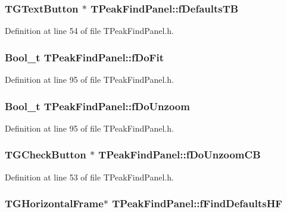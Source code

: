 \subsubsection[{fDefaultsTB}]{\setlength{\rightskip}{0pt plus 5cm}TGTextButton $\ast$ {\bf TPeakFindPanel::fDefaultsTB}\hspace{0.3cm}{\ttfamily  [private]}}\label{classTPeakFindPanel_a9b6f02b821aef2b76c3e3dc5cccca726}


Definition at line 54 of file TPeakFindPanel.h.
\subsubsection[{fDoFit}]{\setlength{\rightskip}{0pt plus 5cm}Bool\_\-t {\bf TPeakFindPanel::fDoFit}\hspace{0.3cm}{\ttfamily  [protected]}}\label{classTPeakFindPanel_a0d1c1e970b53cbae773a3fca98434573}


Definition at line 95 of file TPeakFindPanel.h.
\subsubsection[{fDoUnzoom}]{\setlength{\rightskip}{0pt plus 5cm}Bool\_\-t {\bf TPeakFindPanel::fDoUnzoom}\hspace{0.3cm}{\ttfamily  [protected]}}\label{classTPeakFindPanel_aa389f7df82bc4271586f596129ee7616}


Definition at line 95 of file TPeakFindPanel.h.
\subsubsection[{fDoUnzoomCB}]{\setlength{\rightskip}{0pt plus 5cm}TGCheckButton $\ast$ {\bf TPeakFindPanel::fDoUnzoomCB}\hspace{0.3cm}{\ttfamily  [private]}}\label{classTPeakFindPanel_aeebf59829a320058c0293accf850b732}


Definition at line 53 of file TPeakFindPanel.h.
\subsubsection[{fFindDefaultsHF}]{\setlength{\rightskip}{0pt plus 5cm}TGHorizontalFrame$\ast$ {\bf TPeakFindPanel::fFindDefaultsHF}\hspace{0.3cm}{\ttfamily  [private]}}\label{classTPeakFindPanel_a6487341a98d29539bba3638b20e27a7b}


